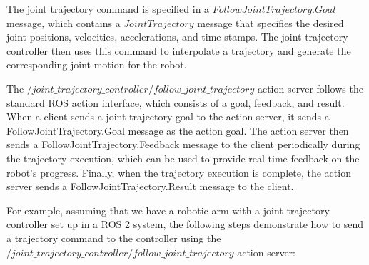 \documentclass[12pt,oneside]{article}
\begin{document}
The joint trajectory command is specified in a $FollowJointTrajectory.Goal$ message, which contains a $JointTrajectory$ message that specifies the desired joint positions, velocities, accelerations, and time stamps. The joint trajectory controller then uses this command to interpolate a trajectory and generate the corresponding joint motion for the robot.

The $/joint\_trajectory\_controller/follow\_joint\_trajectory$ action server follows the standard ROS action interface, which consists of a goal, feedback, and result. When a client sends a joint trajectory goal to the action server, it sends a FollowJointTrajectory.Goal message as the action goal. The action server then sends a FollowJointTrajectory.Feedback message to the client periodically during the trajectory execution, which can be used to provide real-time feedback on the robot's progress. Finally, when the trajectory execution is complete, the action server sends a FollowJointTrajectory.Result message to the client.

For example, assuming that we have a robotic arm with a joint trajectory controller set up in a ROS 2 system, the following steps demonstrate how to send a trajectory command to the controller using the $/joint\_trajectory\_controller/follow\_joint\_trajectory$ action server:
\end{document}
